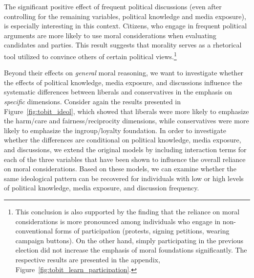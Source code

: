 \documentclass[12pt]{article}
\begin{document}
The significant positive effect of frequent political discussions (even after controlling for the remaining variables, political knowledge and media exposure), is especially interesting in this context. Citizens, who engage in frequent political arguments are more likely to use moral considerations when evaluating candidates and parties. This result suggests that morality serves as a rhetorical tool utilized to convince others of certain political views.\footnote{This conclusion is also supported by the finding that the reliance on moral considerations is more pronounced among individuals who engage in non-conventional forms of participation (protests, signing petitions, wearing campaign buttons). On the other hand, simply participating in the previous election did not increase the emphasis of moral foundations significantly. The respective results are presented in the appendix, Figure~\ref{fig:tobit_learn_participation}.}

Beyond their effects on \textit{general} moral reasoning, we want to investigate whether the effects of political knowledge, media exposure, and discussions influence the systematic differences between liberals and conservatives in the emphasis on \textit{specific} dimensions. Consider again the results presented in Figure~\ref{fig:tobit_ideol}, which showed that liberals were more likely to emphasize the harm/care and fairness/reciprocity dimensions, while conservatives were more likely to emphasize the ingroup/loyalty foundation. In order to investigate whether the differences are conditional on political knowledge, media exposure, and discussions, we extend the original models by including interaction terms for each of the three variables that have been shown to influence the overall reliance on moral considerations. Based on these models, we can examine whether the same ideological pattern can be recovered for individuals with low or high levels of political knowledge, media exposure, and discussion frequency.
\end{document}
